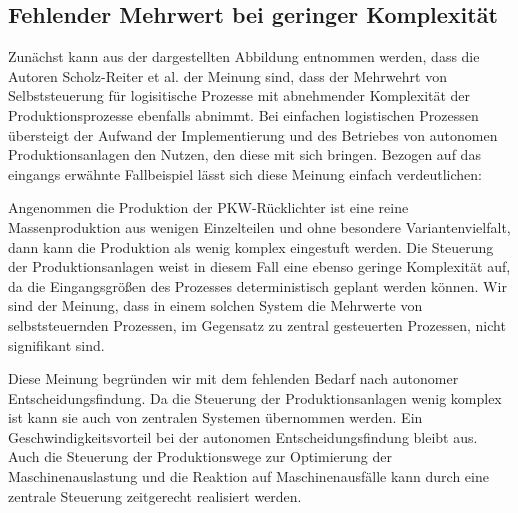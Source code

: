 \subsection{Fehlender Mehrwert bei geringer Komplexität}
\label{sec:GrenzenKomplexitaet}

Zunächst kann aus der dargestellten Abbildung entnommen werden, dass die Autoren
Scholz-Reiter et al. der Meinung sind, dass der Mehrwehrt von
Selbststeuerung für logisitische Prozesse mit abnehmender Komplexität der
Produktionsprozesse ebenfalls abnimmt. Bei einfachen logistischen Prozessen
übersteigt der Aufwand der Implementierung und des Betriebes von autonomen
Produktionsanlagen den Nutzen, den diese mit sich bringen. Bezogen auf das
eingangs erwähnte Fallbeispiel lässt sich diese Meinung einfach verdeutlichen:

Angenommen die Produktion der PKW-Rücklichter ist eine reine Massenproduktion
aus wenigen Einzelteilen und ohne besondere Variantenvielfalt, dann kann die
Produktion als wenig komplex eingestuft werden. Die Steuerung der
Produktionsanlagen weist in diesem Fall eine ebenso geringe Komplexität auf, da
die Eingangsgrößen des Prozesses deterministisch geplant werden können. Wir sind
der Meinung, dass in einem solchen System die Mehrwerte von selbststeuernden
Prozessen, im Gegensatz zu zentral gesteuerten Prozessen, nicht signifikant
sind.

Diese Meinung begründen wir mit dem fehlenden Bedarf nach autonomer
Entscheidungsfindung. Da die Steuerung der Produktionsanlagen wenig komplex ist
kann sie auch von zentralen Systemen übernommen werden. Ein
Geschwindigkeitsvorteil bei der autonomen Entscheidungsfindung bleibt aus. Auch
die Steuerung der Produktionswege zur Optimierung der Maschinenauslastung und
die Reaktion auf Maschinenausfälle kann durch eine zentrale Steuerung
zeitgerecht realisiert werden.
